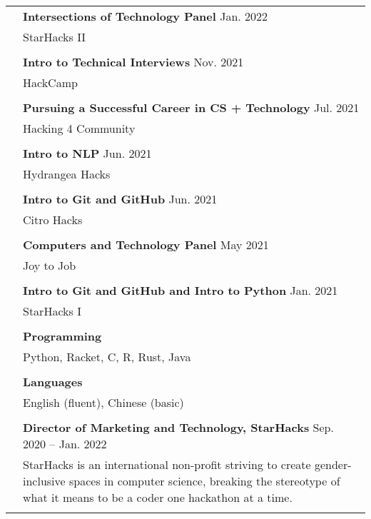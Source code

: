 \documentclass[letterpaper, 11pt]{article}
\begin{document}
\begin{longtable}{p{1.3in}p{4.8in}}

{\color{Blue}{Talks and tutorials}} 
& \textbf{Intersections of Technology Panel} \hfill Jan. 2022 \\
& StarHacks II \\
& \\

& \textbf{Intro to Technical Interviews} \hfill Nov. 2021 \\
& HackCamp \\
& \\

& \textbf{Pursuing a Successful Career in CS + Technology} \hfill Jul. 2021 \\
& Hacking 4 Community \\
& \\

& \textbf{Intro to NLP} \hfill Jun. 2021 \\
& Hydrangea Hacks \\
& \\

& \textbf{Intro to Git and GitHub} \hfill Jun. 2021 \\
& Citro Hacks \\
& \\

& \textbf{Computers and Technology Panel} \hfill May 2021 \\
& Joy to Job \\
& \\

& \textbf{Intro to Git and GitHub and Intro to Python} \hfill Jan. 2021 \\
& StarHacks I \\
& \\


{\color{Blue}{Skills}} 
& \textbf{Programming} \\
& Python, Racket, C, R, Rust, Java \\
& \\

& \textbf{Languages} \\
& English (fluent), Chinese (basic) \\
& \\


\color{Blue}{Service and outreach}
& \textbf{Director of Marketing and Technology, StarHacks} \hfill Sep. 2020 -- Jan. 2022 \\
& StarHacks is an international non-profit striving to create gender-inclusive spaces in computer science, breaking the stereotype of what it means to be a coder one hackathon at a time. \\
& \\


\end{longtable}
\end{document}
